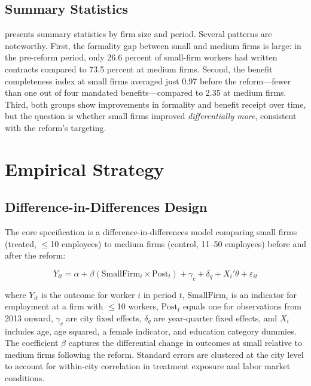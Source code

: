 \documentclass[12pt]{article}
\begin{document}
\subsection{Summary Statistics}

 presents summary statistics by firm size and period. Several patterns are noteworthy. First, the formality gap between small and medium firms is large: in the pre-reform period, only 26.6 percent of small-firm workers had written contracts compared to 73.5 percent at medium firms. Second, the benefit completeness index at small firms averaged just 0.97 before the reform---fewer than one out of four mandated benefits---compared to 2.35 at medium firms. Third, both groups show improvements in formality and benefit receipt over time, but the question is whether small firms improved \textit{differentially more}, consistent with the reform's targeting.



\section{Empirical Strategy}
\label{sec:strategy}

\subsection{Difference-in-Differences Design}

The core specification is a difference-in-differences model comparing small firms (treated, $\leq$10 employees) to medium firms (control, 11--50 employees) before and after the reform:

\begin{equation}
\label{eq:did}
Y_{it} = \alpha + \beta \left(\text{SmallFirm}_i \times \text{Post}_t\right) + \gamma_c + \delta_q + X_i'\theta + \varepsilon_{it}
\end{equation}

\noindent where $Y_{it}$ is the outcome for worker $i$ in period $t$, $\text{SmallFirm}_i$ is an indicator for employment at a firm with $\leq$10 workers, $\text{Post}_t$ equals one for observations from 2013 onward, $\gamma_c$ are city fixed effects, $\delta_q$ are year-quarter fixed effects, and $X_i$ includes age, age squared, a female indicator, and education category dummies. The coefficient $\beta$ captures the differential change in outcomes at small relative to medium firms following the reform. Standard errors are clustered at the city level to account for within-city correlation in treatment exposure and labor market conditions.
\end{document}

